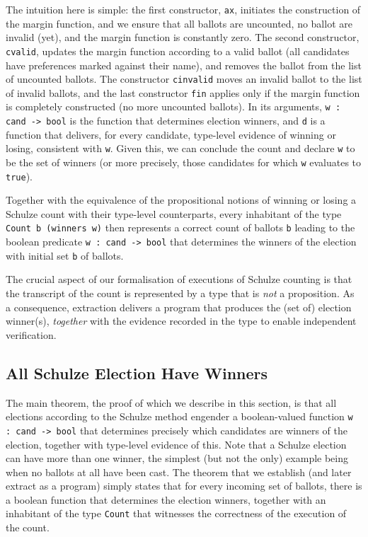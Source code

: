 \noindent
The intuition here is simple: the first constructor, \texttt{ax},
initiates the construction of the margin function, and we ensure
that all ballots are uncounted, no ballot are invalid (yet), and the
margin function is constantly zero. The second constructor,
\texttt{cvalid}, updates the margin function according to a valid
ballot (all candidates have preferences marked against their name),
and removes the ballot from the list of uncounted ballots. The
constructor \texttt{cinvalid} moves an invalid ballot to the list of
invalid ballots, and the last constructor \texttt{fin} applies only
if the margin function is completely constructed (no more uncounted
ballots). In its arguments, \texttt{w : cand -> bool} is the function
that determines election winners, and \texttt{d} is a function that
delivers, for every candidate, type-level evidence of winning or
losing, consistent with \texttt{w}. Given this, we can conclude the
count and declare \texttt{w} to be the set of winners (or more
precisely, those candidates for which \texttt{w} evaluates to
\texttt{true}).

Together with the equivalence of the propositional notions of
winning or losing a Schulze count with their type-level
counterparts, every inhabitant of the type \texttt{Count b (winners
w)} then represents a correct count of ballots \texttt{b} leading to
the boolean predicate \texttt{w : cand -> bool} that determines the
winners of the election with initial set \texttt{b} of ballots.

The crucial aspect of our formalisation of executions of Schulze
counting is that the transcript of the count is represented by a
type that is \emph{not} a proposition. As a consequence, extraction
delivers a program that produces the (set of) election winner(s),
\emph{together} with the evidence recorded in the type to enable
independent verification.




\subsection{All Schulze Election Have Winners}
\label{sec:all_winners}
The main theorem, the proof of which we describe in this section, is
that all elections according to the Schulze method engender a
boolean-valued function \texttt{w : cand -> bool}
that determines
precisely which candidates are winners of the election, together
with type-level evidence of this.
Note that a Schulze election can have more
than one winner, the simplest (but not the only) example being when
no ballots at all have been cast.
The theorem that we establish (and later extract as a program)
simply states that for every incoming set of ballots, there is a
boolean function that determines the election winners, together with
an inhabitant of the type \texttt{Count} that witnesses the
correctness of the execution of the count. 

